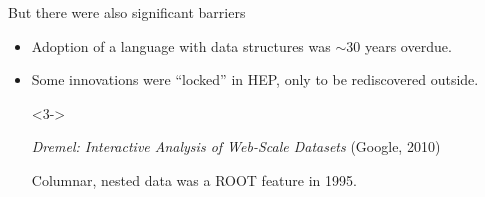 \documentclass[aspectratio=169]{beamer}
\begin{document}
\begin{frame}{But there were also significant barriers}
\large
\vspace{0.5 cm}
\begin{itemize}\setlength{\itemsep}{0.75 cm}
\item Adoption of a language with data structures was $\sim$30 years overdue.

\item<2-> Some innovations were ``locked'' in HEP, only to be rediscovered outside.

\vspace{0.5 cm}
\begin{uncoverenv}<3->
\begin{center}
{\it Dremel: Interactive Analysis of Web-Scale Datasets} (Google, 2010)

\vspace{0.25 cm}

\vspace{0.25 cm}
Columnar, nested data was a ROOT feature in 1995.
\end{center}
\end{uncoverenv}
\end{itemize}
\end{frame}
\end{document}
